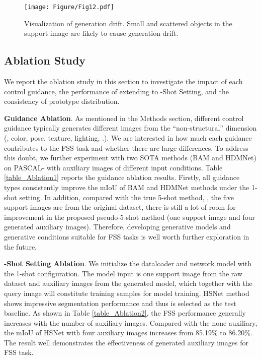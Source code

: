 \documentclass[sigconf]{acmart}
\begin{document}
\begin{figure*}[tb]
    \texttt{[image: Figure/Fig12.pdf]}
    \caption{Visualization of generation drift. Small and scattered objects in the support image are likely to cause generation drift.}
    \label{Fig12_label}
\end{figure*}



\subsection{Ablation Study}
We report the ablation study in this section to investigate the impact of each control guidance, the performance of extending to -Shot Setting, and the consistency of prototype distribution. 

\textbf{Guidance Ablation}. As mentioned in the Methods section, different control guidance typically generates different images from the ``non-structural'' dimension (, color, pose, texture, lighting, .). We are interested in how much each guidance contributes to the FSS task and whether there are large differences. To address this doubt, we further experiment with two SOTA methods (BAM \cite{BAM2022} and HDMNet\cite{HDMNet2023}) on PASCAL- with auxiliary images of different input conditions. Table \ref{table_Ablation1} reports the guidance ablation results. Firstly, all guidance types consistently improve the mIoU of BAM and HDMNet methods under the 1-shot setting. In addition, compared with the true 5-shot method, , the five support images are from the original dataset, there is still a lot of room for improvement in the proposed pseudo-5-shot method (one support image and four generated auxiliary images). Therefore, developing generative models and generative conditions suitable for FSS tasks is well worth further exploration in the future.




\textbf{-Shot Setting Ablation}. We initialize the dataloader and network model with the 1-shot configuration. The model input is one support image from the raw dataset and  auxiliary images from the generated model, which together with the query image will constitute  training samples for model training. HSNet method \cite{HSNet2021} shows impressive segmentation performance and thus is selected as the test baseline. As shown in Table \ref{table_Ablation2}, the FSS performance generally increases with the number of auxiliary images. Compared with the none auxiliary, the mIoU of HSNet with four auxiliary images increases from 85.19\% to 86.20\%. The result well demonstrates the effectiveness of generated auxiliary images for FSS task.
\end{document}

